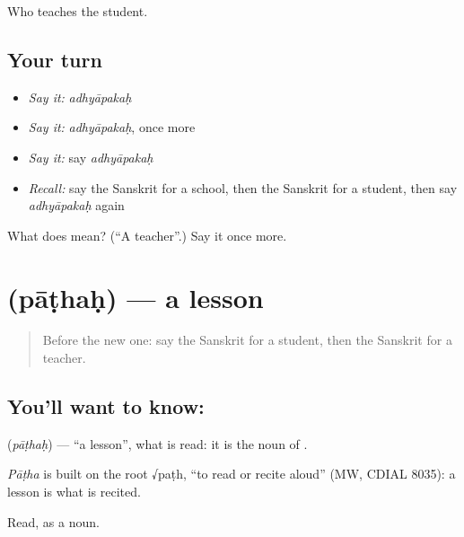 \begin{grammarlens}[title={What you've built}]
Who teaches the student.
\end{grammarlens}

\subsection*{Your turn}
\begin{itemize}
\raggedright
  \item \emph{Say it:} \emph{adhyāpakaḥ}
  \item \emph{Say it:} \emph{adhyāpakaḥ}, once more
  \item \emph{Say it:} say \emph{adhyāpakaḥ}
  \item \emph{Recall:} say the Sanskrit for a school, then the Sanskrit for a student, then say \emph{adhyāpakaḥ} again
\end{itemize}

\begin{tcolorbox}[breakable,colback=teal!4,colframe=teal!35!black,title={Before you move on}]
What does  mean? (\textquotedblleft{}A teacher\textquotedblright{}.) Say it once more.
\end{tcolorbox}
\section[\texorpdfstring{\sk{पाठः} (pāṭhaḥ)}{पाठः (pāṭhaḥ)}]{ (pāṭhaḥ) — a lesson}

\label{lesson:SA-C83-lesson}



\begin{quote}
Before the new one: say the Sanskrit for a student, then the Sanskrit for a teacher.
\end{quote}

\subsection*{You'll want to know: }
\textbf{} (\emph{pāṭhaḥ}) — \textquotedblleft{}a lesson\textquotedblright{}, what is read: it is the noun of \textbf{}.

\begin{cousinweb}
\emph{Pāṭha} is built on the root √paṭh, \textquotedblleft{}to read or recite aloud\textquotedblright{} (MW, CDIAL 8035): a lesson is what is recited.
\end{cousinweb}

\begin{grammarlens}[title={What you've built}]
Read, as a noun.
\end{grammarlens}

